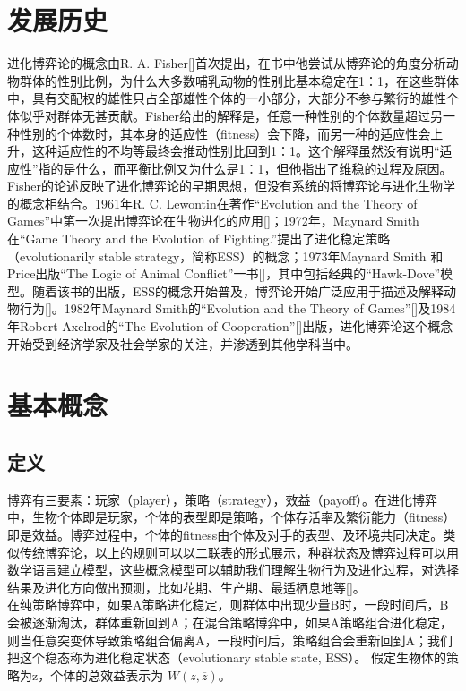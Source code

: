 \documentclass[12pt]{article}
\begin{document}
\section{发展历史} 
 进化博弈论的概念由R. A. Fisher[\cite{fisher1930genetical}]首次提出，在书中他尝试从博弈论的角度分析动物群体的性别比例，为什么大多数哺乳动物的性别比基本稳定在1：1，在这些群体中，具有交配权的雄性只占全部雄性个体的一小部分，大部分不参与繁衍的雄性个体似乎对群体无甚贡献。Fisher给出的解释是，任意一种性别的个体数量超过另一种性别的个体数时，其本身的适应性（fitness）会下降，而另一种的适应性会上升，这种适应性的不均等最终会推动性别比回到1：1。这个解释虽然没有说明“适应性”指的是什么，而平衡比例又为什么是1：1，但他指出了维稳的过程及原因。
 Fisher的论述反映了进化博弈论的早期思想，但没有系统的将博弈论与进化生物学的概念相结合。1961年R. C. Lewontin在著作“Evolution and the Theory of Games”中第一次提出博弈论在生物进化的应用[\cite{lewontin1961evolution}]；1972年，Maynard Smith在“Game Theory and the Evolution of Fighting.”提出了进化稳定策略（evolutionarily stable strategy，简称ESS）的概念；1973年Maynard Smith 和 Price出版“The Logic of Animal Conflict”一书[\cite{smith1973logic}]，其中包括经典的“Hawk-Dove”模型。随着该书的出版，ESS的概念开始普及，博弈论开始广泛应用于描述及解释动物行为[\cite{dugatkin2000game}]。1982年Maynard Smith的“Evolution and the Theory of Games”[\cite{smith1982evolution}]及1984年Robert Axelrod的“The Evolution of Cooperation”[\cite{suleiman1996evolution}]出版，进化博弈论这个概念开始受到经济学家及社会学家的关注，并渗透到其他学科当中。

\section{基本概念}
 \subsection{定义}
博弈有三要素：玩家（player），策略（strategy），效益（payoff）。在进化博弈中，生物个体即是玩家，个体的表型即是策略，个体存活率及繁衍能力（fitness）即是效益。博弈过程中，个体的fitness由个体及对手的表型、及环境共同决定。类似传统博弈论，以上的规则可以以二联表的形式展示，种群状态及博弈过程可以用数学语言建立模型，这些概念模型可以辅助我们理解生物行为及进化过程，对选择结果及进化方向做出预测，比如花期、生产期、最适栖息地等[\cite{day2003evolutionary}]。\\
在纯策略博弈中，如果A策略进化稳定，则群体中出现少量B时，一段时间后，B会被逐渐淘汰，群体重新回到A；在混合策略博弈中，如果A策略组合进化稳定，则当任意突变体导致策略组合偏离A，一段时间后，策略组合会重新回到A；我们把这个稳态称为进化稳定状态（evolutionary stable state, ESS）。
假定生物体的策略为z，个体的总效益表示为 $W(z,\overline{z})$。
\end{document}
